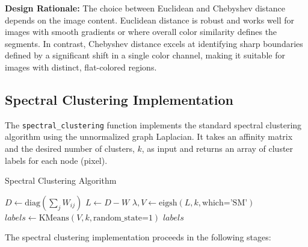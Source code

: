 \documentclass[12pt,a4paper]{article}
\begin{document}
\textbf{Design Rationale:}
The choice between Euclidean and Chebyshev distance depends on the image content. Euclidean distance is robust and works well for images with smooth gradients or where overall color similarity defines the segments. In contrast, Chebyshev distance excels at identifying sharp boundaries defined by a significant shift in a single color channel, making it suitable for images with distinct, flat-colored regions.


\subsection{Spectral Clustering Implementation}
\label{subsec:spectral_impl}

The \texttt{spectral\_clustering} function implements the standard spectral clustering algorithm using the unnormalized graph Laplacian. It takes an affinity matrix and the desired number of clusters, $k$, as input and returns an array of cluster labels for each node (pixel).

\begin{algorithm}[H]
    \caption{Spectral Clustering Algorithm}
    \begin{algorithmic}[1]
            \State $D \gets \text{diag}(\sum_{j} W_{ij})$ 
            \State $L \gets D - W$ 
            \State $\lambda, V \gets \text{eigsh}(L, k, \text{which='SM'})$ 
            \State $labels \gets \text{KMeans}(V, k, \text{random\_state=1})$ 
            \State \Return $labels$
        \EndFunction
    \end{algorithmic}
\end{algorithm}

The spectral clustering implementation proceeds in the following stages:
\end{document}
